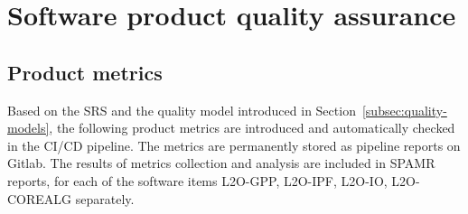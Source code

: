 \section{Software product quality assurance}
\label{sec:product-quality}

%
%
%
%
%
%
%

%
%
%
%
%
%
%
%
%

\subsection{Product metrics}
\label{subsec:product-metrics}

Based on the SRS and the quality model introduced in Section~\ref{subsec:quality-models}, the following product metrics are introduced and automatically checked in the CI/CD pipeline. The metrics are permanently stored as pipeline reports on Gitlab. The results of metrics collection and analysis are included in SPAMR reports, for each of the software items L2O-GPP, L2O-IPF, L2O-IO, L2O-COREALG separately.

